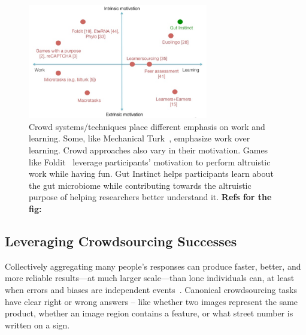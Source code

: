 
\begin{figure}[h]
  \centering
  \includegraphics[width=0.7\textwidth]{figures/gutinstinct/gi-2.png}
  \caption[Crowd systems/techniques place different emphasis on
work and learning]
{Crowd systems/techniques place different emphasis on
work and learning. Some, like Mechanical Turk~\cite{Amazon2016}, emphasize
work over learning. Crowd approaches also vary in their motivation.
Games like Foldit~\cite{Cooper2010} leverage participants’ motivation
to perform altruistic work while having fun. Gut Instinct helps
participants learn about the gut microbiome while contributing
towards the altruistic purpose of helping researchers better
understand it.    \textbf{Refs for the fig: ~\cite{Chen2016b}}}
  \label{fig:gi-2}
\end{figure}

\subsection{Leveraging Crowdsourcing Successes}
Collectively aggregating many people’s responses can produce faster, better, and more reliable results---at much larger scale---than lone individuals can, at least when errors and biases are independent events~\cite{Surowiecki2005}. Canonical crowdsourcing tasks have clear right or wrong answers – like whether two images represent the same product, whether an image region contains a feature, or what street number is written on a sign.


